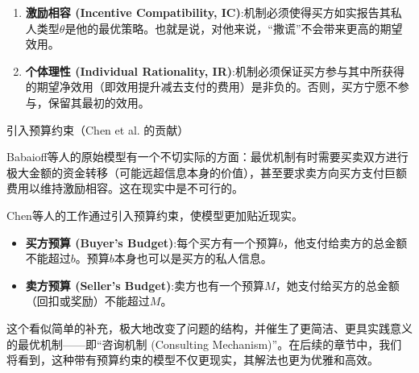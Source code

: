  \begin{enumerate}
    \item \textbf{激励相容 (Incentive Compatibility, IC)}:机制必须使得买方如实报告其私人类型$\theta$是他的最优策略。也就是说，对他来说，“撒谎”不会带来更高的期望效用。
    \item \textbf{个体理性 (Individual Rationality, IR)}:机制必须保证买方参与其中所获得的期望净效用（即效用提升减去支付的费用）是非负的。否则，买方宁愿不参与，保留其最初的效用。
 \end{enumerate}

 引入预算约束（Chen et al. 的贡献）

 Babaioff等人的原始模型有一个不切实际的方面：最优机制有时需要买卖双方进行极大金额的资金转移（可能远超信息本身的价值），甚至要求卖方向买方支付巨额费用以维持激励相容。这在现实中是不可行的。

 Chen等人的工作通过引入预算约束，使模型更加贴近现实。

 \begin{itemize}
    \item \textbf{买方预算 (Buyer's Budget)}:每个买方有一个预算$b$，他支付给卖方的总金额不能超过$b$。预算$b$本身也可以是买方的私人信息。
    \item \textbf{卖方预算 (Seller's Budget)}:卖方也有一个预算$M$，她支付给买方的总金额（回扣或奖励）不能超过$M$。
 \end{itemize}

 这个看似简单的补充，极大地改变了问题的结构，并催生了更简洁、更具实践意义的最优机制——即“咨询机制 (Consulting Mechanism)”。在后续的章节中，我们将看到，这种带有预算约束的模型不仅更现实，其解法也更为优雅和高效。
